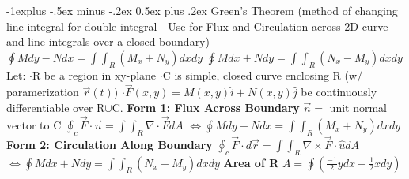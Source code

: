 \documentclass[10pt,landscape]{article}
\makeatletter
\renewcommand{\subsection}{\@startsection{subsection}{2}{0mm}%
                                {-1explus -.5ex minus -.2ex}%
                                {0.5ex plus .2ex}%
                                {\normalfont\normalsize\bfseries}}
\makeatother
\begin{document}
\begin{multicols*}{5}
\subsection{Green's Theorem}
(method of changing line integral for double integral - Use for Flux and Circulation across 2D curve and line integrals over a closed boundary)\newline
$ \oint Mdy - Ndx = \int\int_R(M_x+N_y)dxdy $\newline
$ \oint Mdx + Ndy = \int\int_R (N_x-M_y) dxdy $\newline
Let:\newline
$\cdot$R be a region in xy-plane\newline
$\cdot$C is simple, closed curve enclosing R (w/ paramerization $ \vec{r}(t) $)\newline
$ \cdot\vec{F}(x,y) = M(x,y)\hat{i} + N(x,y)\hat{j} $ be continuously differentiable over R$\cup$C. \newline
\textbf{Form 1: Flux Across Boundary}\newline
$ \vec{n} = $ unit normal vector to C\newline
$ \oint_c \vec{F}\cdot\vec{n} = \int\int_R \nabla\cdot\vec{F} dA $\newline
$ \Leftrightarrow\oint Mdy - Ndx = \int\int_R(M_x+N_y)dxdy $\newline
\textbf{Form 2: Circulation Along Boundary}\newline
$ \oint_c\vec{F}\cdot d\vec{r} = \int\int_R \nabla\times\vec{F}\cdot\hat{u} dA $\newline
$ \Leftrightarrow \oint Mdx + Ndy = \int\int_R (N_x-M_y) dxdy $\newline
\textbf{Area of R}\newline
$ A = \oint(\frac{-1}{2}y dx + \frac{1}{2}x dy) $


\end{multicols*}
\end{document}
